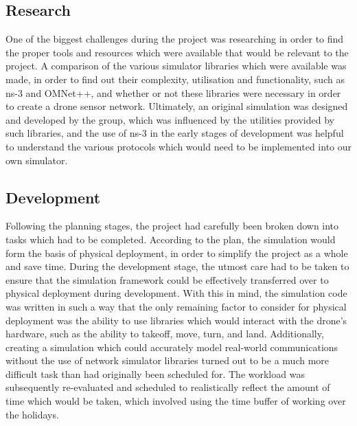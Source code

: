 \subsection{Research}
One of the biggest challenges during the project was researching in order to find the proper tools and resources which were available that would be relevant to the project. A comparison of the various simulator libraries which were available was made, in order to find out their complexity, utilisation and functionality, such as ns-3 and OMNet++, and whether or not these libraries were necessary in order to create a drone sensor network. Ultimately, an original simulation was designed and developed by the group, which was influenced by the utilities provided by such libraries, and the use of ns-3 in the early stages of development was helpful to understand the various protocols which would need to be implemented into our own simulator.

\subsection{Development}
Following the planning stages, the project had carefully been broken down into tasks which had to be completed. According to the plan, the simulation would form the basis of physical deployment, in order to simplify the project as a whole and save time. During the development stage, the utmost care had to be taken to ensure that the simulation framework could be effectively transferred over to physical deployment during development. With this in mind, the simulation code was written in such a way that the only remaining factor to consider for physical deployment was the ability to use libraries which would interact with the drone's hardware, such as the ability to takeoff, move, turn, and land. Additionally, creating a simulation which could accurately model real-world communications without the use of network simulator libraries turned out to be a much more difficult task than had originally been scheduled for. The workload was subsequently re-evaluated and scheduled to realistically reflect the amount of time which would be taken, which involved using the time buffer of working over the holidays.

